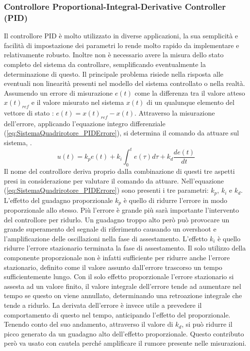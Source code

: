 \subsubsection{Controllore Proportional-Integral-Derivative Controller (PID)}
Il controllore PID è molto utilizzato in diverse applicazioni, la sua semplicità e facilità di impostazione dei parametri lo rende molto rapido da implementare e relativamente robusto. Inoltre non è necessario avere la misura dello stato completo del sistema da controllare, semplificando eventualmente la determinazione di questo. Il principale problema risiede nella risposta alle eventuali non linearità presenti nel modello del sistema controllato o nella realtà.
Assumendo un errore di misurazione $e(t)$ come la differenza tra il valore atteso $x(t)_{ref}$ e il valore misurato nel sistema $x(t)$ di un qualunque elemento del vettore di stato : $e(t)=x(t)_{ref}-x(t)$. Attraverso la misurazione dell'errore, applicando l'equazione integro differenziale (\ref{eq:SistemaQuadrirotore_PIDErrore}), si determina il comando da attuare sul sistema, \cite{advanced-pid-control}.
\begin{equation}\label{eq:SistemaQuadrirotore_PIDErrore}
	u(t) = k_p e(t) + k_i \int_0^t e(\tau) d\tau + k_d \frac{d e(t)}{d t}
\end{equation}
Il nome del controllore deriva proprio dalla combinazione di questi tre aspetti presi in considerazione per valutare il comando da attuare.
Nell'equazione (\ref{eq:SistemaQuadrirotore_PIDErrore}) sono presenti i tre parametri: $k_p$, $k_i$ e $k_d$.
L'effetto del guadagno proporzionale $k_p$ è quello di ridurre l'errore in modo proporzionale allo stesso. Più l'errore è grande più sarà importante l'intervento del controllore per ridurlo. Un guadagno troppo alto però può provocare un grande superamento del segnale di riferimento causando un overshoot e l'amplificazione delle oscillazioni nella fase di assestamento.
L'effetto $k_i$ è quello ridurre l'errore stazionario terminata la fase di assestamento. Il solo utilizzo della componente proporzionale non è infatti sufficiente per ridurre anche l'errore stazionario, definito come il valore assunto dall'errore trascorso un tempo sufficientemente lungo. Con il solo effetto proporzionale l'errore stazionario si assesta ad un valore finito, il valore integrale dell'errore tende ad aumentare nel tempo se questo on viene annullato, determinando una retroazione integrale che tende a ridurlo.
La derivata dell'errore è invece utile a prevedere il comportamento di questo nel tempo, anticipando l'effetto del proporzionale. Tenendo conto del suo andamento, attraverso il valore di $k_d$, si può ridurre il picco generato da un guadagno alto dell'effetto proporzionale. Questo contributo però va usato con cautela perché amplificare il rumore presente nelle misurazioni.
